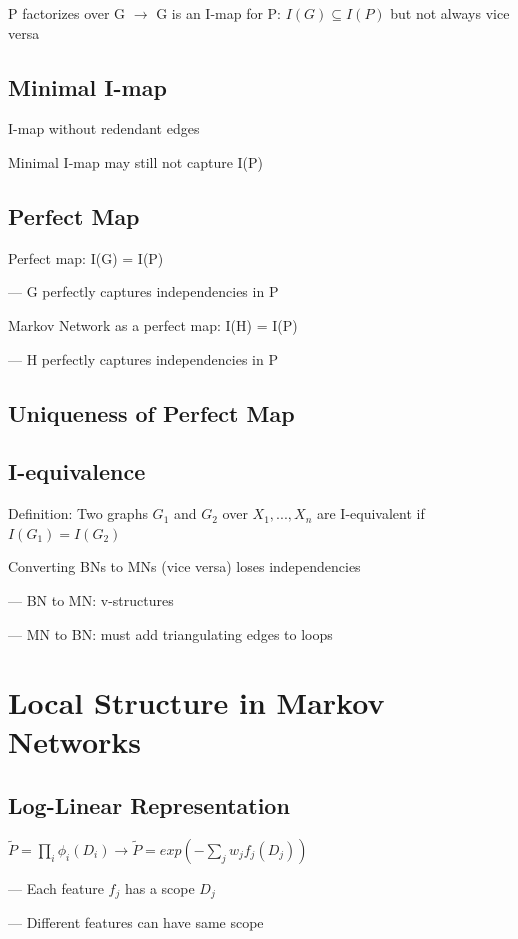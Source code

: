 \documentclass{book}
\begin{document}
 P factorizes over G $\rightarrow$ G is an I-map for P: $I(G) \subseteq I(P)$ but not always vice versa
 
 \subsection{Minimal I-map}
 I-map without redendant edges
 
 Minimal I-map may still not capture I(P)

\subsection{Perfect Map}
Perfect map: I(G) = I(P)

--- G perfectly captures independencies in P

Markov Network as a perfect map: I(H) = I(P)

--- H perfectly captures independencies in P

\subsection{Uniqueness of Perfect Map}

\subsection{I-equivalence}

Definition: Two graphs $G_1$ and $G_2$ over $X_1,..., X_n$ are I-equivalent if $I(G_1) = I(G_2)$

Converting BNs to MNs (vice versa) loses independencies

--- BN to MN: v-structures

--- MN to BN: must add triangulating edges to loops

\section{Local Structure in Markov Networks}
\subsection{Log-Linear Representation}

$\widetilde{P} = \prod_{i} \phi_i(D_i) \rightarrow \widetilde{P} = exp(-\sum_j w_j f_j (D_j))$

--- Each feature $f_j$ has a scope $D_j$

--- Different features can have same scope
\end{document}

